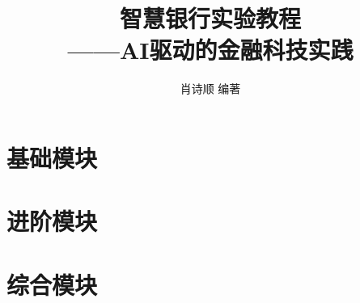 \documentclass[12pt,a4paper,openany]{ctexbook}
\title{
  \vspace{-2cm}
  {\Huge\bfseries 智慧银行实验教程} \\[0.5em]
  {\Large ——AI驱动的金融科技实践}
}
\author{肖诗顺 \quad 编著}
\date{}
\begin{document}
\frontmatter
\maketitle
\tableofcontents

\mainmatter

\part{基础模块}

\part{进阶模块}

\part{综合模块}

\appendix

\backmatter
\printbibliography
\end{document}
